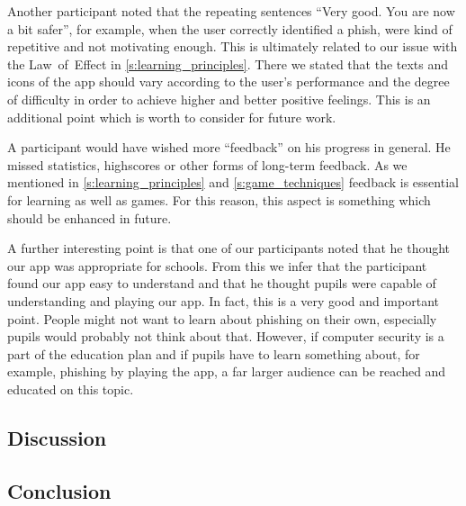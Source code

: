 \begin{description}[leftmargin=0cm]
Another participant noted that the repeating sentences ``Very good. You are now a bit safer'', for example, when the user correctly identified a phish, were kind of repetitive and not motivating enough. This is ultimately related to our issue with the Law~of~Effect in \autoref{s:learning_principles}.
There we stated that the texts and icons of the app should vary according to the user's performance and the degree of difficulty in order to achieve higher and better positive feelings.
This is an additional point which is worth to consider for future work.

A participant would have wished more ``feedback'' on his progress in general. 
He missed statistics, highscores or other forms of long-term feedback.
As we mentioned in \autoref{s:learning_principles} and \autoref{s:game_techniques} feedback is essential for learning as well as games.
For this reason, this aspect is something which should be enhanced in future.

A further interesting point is that one of our participants noted that he thought our app was appropriate for schools.
From this we infer that the participant found our app easy to understand and that he thought pupils were capable of understanding and playing our app.
In fact, this is a very good and important point.
People might not want to learn about phishing on their own, especially pupils would probably not think about that.
However, if computer security is a part of the education plan and if pupils have to learn something about, for example, phishing by playing the app, a far larger audience can be reached and educated on this topic.	
\end{description}
\subsection{Discussion}
\subsection{Conclusion}
